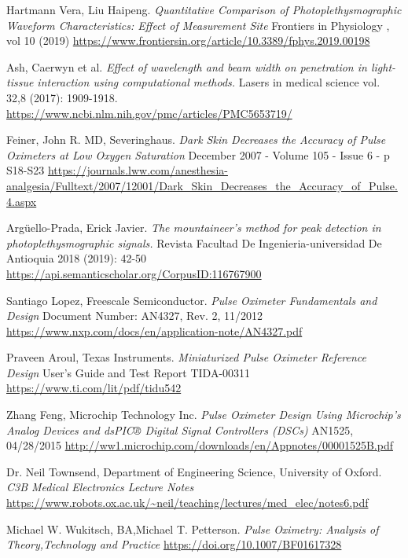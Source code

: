 \documentclass[10pt,a4paper]{article}
\begin{document}
	
	\begin{thebibliography}{10}		
		\begin{english}
			
		Hartmann Vera, Liu Haipeng.
		\textit{Quantitative Comparison of Photoplethysmographic 
			Waveform Characteristics: Effect of Measurement Site}
		Frontiers in Physiology , vol 10 (2019)
		\url{https://www.frontiersin.org/article/10.3389/fphys.2019.00198}
		
		Ash, Caerwyn et al.
		\textit{Effect of wavelength and beam width on 
			penetration in light-tissue interaction using computational methods.}
		Lasers in medical science vol. 32,8 (2017): 1909-1918.
		\url{https://www.ncbi.nlm.nih.gov/pmc/articles/PMC5653719/}		
		
		Feiner, John R. MD, Severinghaus.
		\textit{Dark Skin Decreases the Accuracy of Pulse Oximeters at 
			Low Oxygen Saturation}
		December 2007 - Volume 105 - Issue 6 - p S18-S23
		\url{https://journals.lww.com/anesthesia-analgesia/Fulltext/2007/12001/Dark_Skin_Decreases_the_Accuracy_of_Pulse.4.aspx}		
		
		Argüello-Prada, Erick Javier. 
		\textit{The mountaineer's method for peak detection in photoplethysmographic signals.} 
		Revista Facultad De Ingenieria-universidad De Antioquia 2018 (2019): 42-50
		\url{https://api.semanticscholar.org/CorpusID:116767900}
		
		Santiago Lopez, Freescale Semiconductor.
		\textit{Pulse Oximeter Fundamentals and Design} 
		Document Number: AN4327, Rev. 2, 11/2012
		\url{https://www.nxp.com/docs/en/application-note/AN4327.pdf}
		
		Praveen Aroul, Texas Instruments.
		\textit{Miniaturized Pulse Oximeter Reference Design}
		User’s Guide and Test Report TIDA-00311
		\url{https://www.ti.com/lit/pdf/tidu542}
		
		Zhang Feng, Microchip Technology Inc.
		\textit{Pulse Oximeter Design Using Microchip’s Analog Devices
			and dsPIC® Digital Signal Controllers (DSCs)}
		AN1525,   04/28/2015
		\url{http://ww1.microchip.com/downloads/en/Appnotes/00001525B.pdf}
		
		Dr. Neil Townsend, Department of Engineering Science, University of Oxford.
		\textit{C3B Medical Electronics Lecture Notes}
		\url{https://www.robots.ox.ac.uk/~neil/teaching/lectures/med_elec/notes6.pdf}	
		
		Michael W. Wukitsch, BA,Michael T. Petterson.
		\textit{Pulse Oximetry: Analysis of Theory,Technology and Practice}
		\url{https://doi.org/10.1007/BF01617328}	
			
		\end{english}	
	\end{thebibliography}
\end{document}
